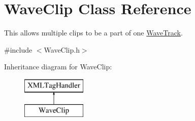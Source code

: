 \hypertarget{class_wave_clip}{}\section{Wave\+Clip Class Reference}
\label{class_wave_clip}


This allows multiple clips to be a part of one \hyperlink{class_wave_track}{Wave\+Track}.  




{\ttfamily \#include $<$Wave\+Clip.\+h$>$}

Inheritance diagram for Wave\+Clip\+:\begin{figure}[H]
\begin{center}
\leavevmode
\includegraphics[height=2.000000cm]{class_wave_clip}
\end{center}
\end{figure}
